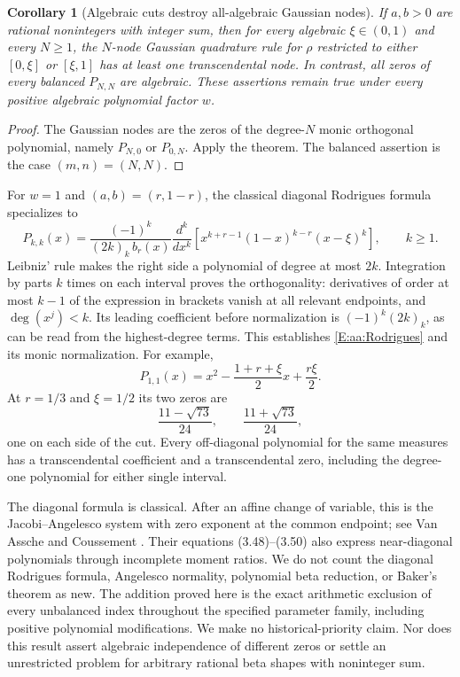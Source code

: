 \documentclass[11pt,a4paper]{article}
\newtheorem{corollary}[theorem]{Corollary}
\theoremstyle{definition}
\theoremstyle{remark}
\numberwithin{equation}{section}
\begin{document}
\begin{corollary}[Algebraic cuts destroy all-algebraic Gaussian nodes]
\label{E:aa:gauss}
If $a,b>0$ are rational nonintegers with integer sum, then for every
algebraic $\xi\in(0,1)$ and every $N\ge1$, the $N$-node Gaussian
quadrature rule for $\rho$ restricted to either $[0,\xi]$ or
$[\xi,1]$ has at least one transcendental node. In contrast, all
zeros of every balanced $P_{N,N}$ are algebraic. These assertions
remain true under every positive algebraic polynomial factor $w$.
\end{corollary}

\begin{proof}
The Gaussian nodes are the zeros of the degree-$N$ monic orthogonal
polynomial, namely $P_{N,0}$ or $P_{0,N}$. Apply the theorem.
The balanced assertion is the case $(m,n)=(N,N)$.
\end{proof}

For $w=1$ and $(a,b)=(r,1-r)$, the classical diagonal Rodrigues
formula specializes to
\begin{equation}\label{E:aa:Rodrigues}
 P_{k,k}(x)=\frac{(-1)^k}{(2k)_k\,b_r(x)}
 \frac{d^k}{dx^k}
 \left[x^{k+r-1}(1-x)^{k-r}(x-\xi)^k\right],\qquad k\ge1.
\end{equation}
Leibniz' rule makes the right side a polynomial of degree at most
$2k$. Integration by parts $k$ times on each interval proves the
orthogonality: derivatives of order at most $k-1$ of the expression
in brackets vanish at all relevant endpoints, and
$\deg(x^j)<k$. Its leading coefficient before normalization is
$(-1)^k(2k)_k$, as can be read from the highest-degree terms.
This establishes \eqref{E:aa:Rodrigues} and its monic normalization.
For example,
\[
 P_{1,1}(x)=x^2-\frac{1+r+\xi}{2}x+\frac{r\xi}{2}.
\]
At $r=1/3$ and $\xi=1/2$ its two zeros are
\[
 \frac{11-\sqrt{73}}{24},\qquad
 \frac{11+\sqrt{73}}{24},
\]
one on each side of the cut. Every off-diagonal polynomial for the
same measures has a transcendental coefficient and a transcendental
zero, including the degree-one polynomial for either single interval.

The diagonal formula is classical. After an affine change of variable,
this is the Jacobi--Angelesco system with zero exponent at the common
endpoint; see Van Assche and Coussement \cite[\S3.5,
Eq.~(3.45)]{aa:VanAsscheCoussement}. Their equations (3.48)--(3.50)
also express near-diagonal polynomials through incomplete moment
ratios. We do not count the diagonal Rodrigues formula, Angelesco
normality, polynomial beta reduction, or Baker's theorem as new.
The addition proved here is the exact arithmetic exclusion of every
unbalanced index throughout the specified parameter family, including
positive polynomial modifications. We make no historical-priority
claim. Nor does this result assert algebraic independence of different
zeros or settle an unrestricted problem for arbitrary rational beta
shapes with noninteger sum.
\end{document}
